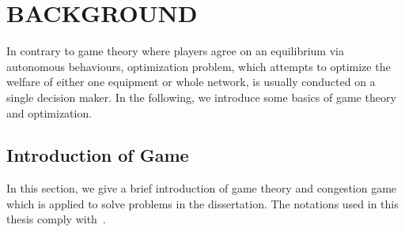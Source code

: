 \chapter{BACKGROUND}
\label{background}

In contrary to game theory where players agree on an equilibrium via autonomous behaviours, optimization problem, which attempts to optimize the welfare of either one equipment or whole network, is usually conducted on a single decision maker.
In the following, we introduce some basics of game theory and optimization.





 

\section{Introduction of Game}
In this section, we give a brief introduction of game theory and congestion game which is applied to solve problems in the dissertation.
The notations used in this thesis comply with~\cite{agt_book}.

\Sigma

